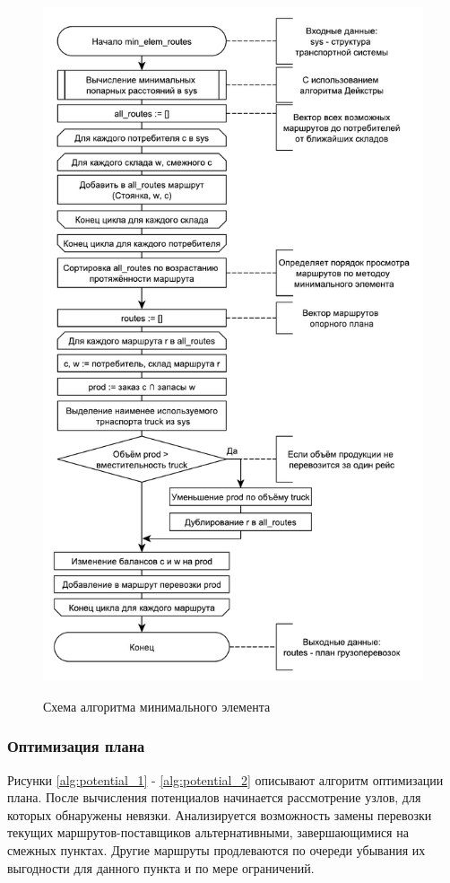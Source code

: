 \begin{figure}[hp]
	\begin{center}
		{\includegraphics[scale=0.7, angle=0, page=1]{img/min_elem_routes.pdf}}
		\caption{Схема алгоритма минимального элемента}
		\label{alg:min_elem}
	\end{center}
\end{figure}

\subsubsection{Оптимизация плана}
Рисунки \ref{alg:potential_1} - \ref{alg:potential_2} описывают алгоритм оптимизации плана. После вычисления потенциалов начинается рассмотрение узлов, для которых обнаружены невязки. Анализируется возможность замены перевозки текущих маршрутов-поставщиков альтернативными, завершающимися на смежных пунктах. Другие маршруты продлеваются по очереди убывания их выгодности для данного пункта и по мере ограничений.

